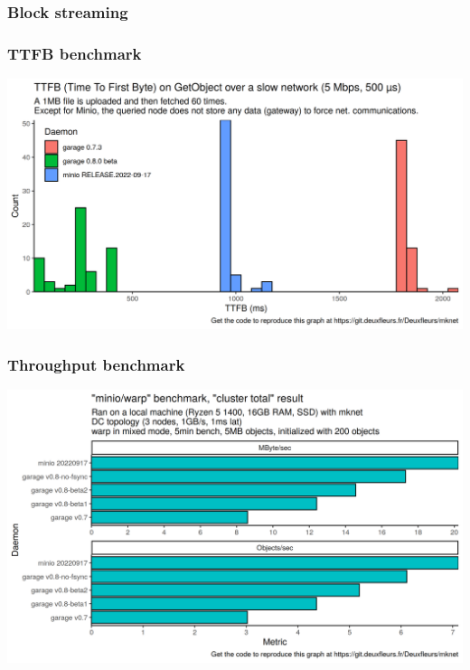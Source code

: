 \documentclass[aspectratio=169]{beamer}
\begin{document}
\begin{frame}
	\frametitle{Block streaming}
	\begin{center}
	\end{center}
\end{frame}

\begin{frame}
	\frametitle{TTFB benchmark}
	\begin{center}
		\includegraphics[width=.8\linewidth]{../assets/perf/ttfb.png}
	\end{center}
\end{frame}

\begin{frame}
	\frametitle{Throughput benchmark}
	\begin{center}
		\includegraphics[width=.7\linewidth]{../assets/perf/io-0.7-0.8-minio.png}
	\end{center}
\end{frame}
\end{document}

